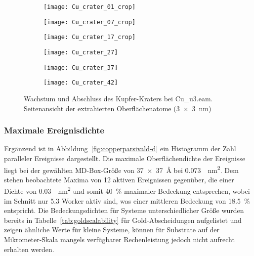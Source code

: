 \begin{figure}

  \captionsetup[subfigure]{justification=centering,singlelinecheck=false}
  \def\subfigwidth{0.32\textwidth}

  \begin{subfigure}[t]{\subfigwidth}
    \texttt{[image: Cu\_crater\_01\_crop]}
  \end{subfigure}
  \hfill
  \begin{subfigure}[t]{\subfigwidth}
    \texttt{[image: Cu\_crater\_07\_crop]}
  \end{subfigure}
  \hfill
  \begin{subfigure}[t]{\subfigwidth}
    \texttt{[image: Cu\_crater\_17\_crop]}
  \end{subfigure}

  \begin{subfigure}[t]{\subfigwidth}
    \texttt{[image: Cu\_crater\_27]}
  \end{subfigure}
  \hfill
  \begin{subfigure}[t]{\subfigwidth}
    \texttt{[image: Cu\_crater\_37]}
  \end{subfigure}
  \hfill
  \begin{subfigure}[t]{\subfigwidth}
    \texttt{[image: Cu\_crater\_42]}
  \end{subfigure}

  \caption{Wachstum und Abschluss des Kupfer-Kraters bei Cu\_u3.eam.\\
    Seitenansicht der extrahierten Oberflächenatome (\SI{3x3}{\nano\meter})
  }
  \label{fig:coppercrater}
\end{figure}

\subsubsection{Maximale Ereignisdichte}
Ergänzend ist in Abbildung~\ref{fig:copperparsivald-d} ein Histogramm der Zahl paralleler Ereignisse dargestellt.
Die maximale Oberflächendichte der Ereignisse liegt bei der gewählten MD-Box-Größe von \SI{37x37}{\angstrom} bei \SI{0.073}{\per\nano\meter\squared}.
Dem stehen beobachtete Maxima von \num{12} aktiven Ereignissen gegenüber, die einer Dichte von \SI{0.03}{\per\nano\meter\squared} und somit \SI{40}{\percent} maximaler Bedeckung entsprechen, wobei im Schnitt nur \num{5.3} Worker aktiv sind, was einer mittleren Bedeckung von \SI{18.5}{\percent} entspricht.
Die Bedeckungsdichten für Systeme unterschiedlicher Größe wurden bereits in Tabelle~\ref{tab:goldscalability} für Gold-Abscheidungen aufgelistet und zeigen ähnliche Werte für kleine Systeme, können für Substrate auf der Mikrometer-Skala mangels verfügbarer Rechenleistung jedoch nicht aufrecht erhalten werden.
